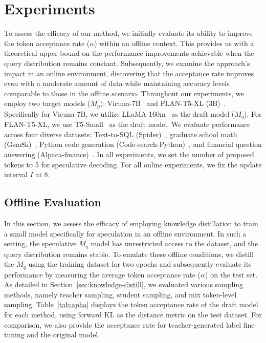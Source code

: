 \section{Experiments}

To assess the efficacy of our method, we initially evaluate its ability to improve the token acceptance rate ($\alpha$) 
within an offline context. 
This provides us with a theoretical upper bound on the performance improvements achievable when the query distribution remains constant. 
Subsequently, we examine the approach's impact in an online environment, discovering that the acceptance rate improves even with a moderate amount of data while maintaining 
accuracy levels comparable to those in the offline scenario. 
Throughout our experiments, we employ two target models ($M_p)$: Vicuna-7B~\citep{vicuna2023} and FLAN-T5-XL (3B)~\citep{chung2022scaling}. Specifically for Vicuna-7B, we utilize LLaMA-160m~\citep{miao2023specinfer} as the draft model ($M_q$). For FLAN-T5-XL, we use T5-Small~\citep{raffel2020exploring} as the draft model. 
We evaluate performance across four diverse datasets: Text-to-SQL (Spider)~\citep{yu2018spider}, graduate school math (Gsm8k)~\citep{cobbe2021gsm8k}, Python code generation (Code-search-Python)~\citep{husain2019codesearchnet}, and financial question answering (Alpaca-finance)~\citep{alpaca-finance}. 
In all experiments, we set the number of proposed tokens to 5 for speculative decoding. For all online experiments, we fix the update interval \( I \) at 8. %

\subsection{Offline Evaluation}
\label{sec:offline-eval}
In this section, we assess the efficacy of employing knowledge distillation to train a small model specifically for speculation in an offline environment. 
In such a setting, the speculative $M_q$ model has unrestricted access to the dataset, and the query distribution remains stable. 
To emulate these offline conditions, we distill the $M_q$ using the training dataset for two epochs and subsequently evaluate its performance by measuring 
the average token acceptance rate ($\alpha$) on the test set.
As detailed in Section~\ref{sec:knowledge-distill}, we evaluated various sampling methods, namely teacher sampling, student sampling, and mix token-level sampling. 
Table~\ref{tab:apha} displays the token acceptance rate of the draft model for each method, using forward KL as the distance metric on the test dataset. 
For comparison, we also provide the acceptance rate for teacher-generated label fine-tuning and the original model.

